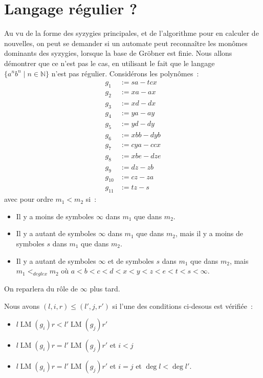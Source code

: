\documentclass{article}
\newcommand{\N}{\mathbb{N}}
\DeclareMathOperator{\LM}{LM}
\begin{document}
\section*{Langage régulier ?}
Au vu de la forme des syzygies principales, et de l'algorithme pour en calculer de nouvelles, on peut se demander si un automate peut reconnaître les monômes dominants des syzygies, lorsque la base de Gröbner est finie.
Nous allons démontrer que ce n'est pas le cas, en utilisant le fait que le langage $\{a^nb^n \;|\; n \in \N\}$ n'est pas régulier.
Considérons les polynômes~:
\begin{align*}
g_1 & := sa - tcx \\
g_2 & := xa - ax \\
g_3 & := xd - dx \\
g_4 & := ya - ay \\
g_5 & := yd - dy \\
g_6 & := xbb - dyb \\
g_7 & := cya - ccx \\
g_8 & := xbe - dze \\
g_9 & := dz - zb \\
g_{10} & := cz - za \\
g_{11} & := tz - s
\end{align*}
avec pour ordre $m_1 < m_2$ si~:
\begin{itemize}
\item Il y a moins de symboles $\infty$ dans $m_1$ que dans $m_2$.
\item Il y a autant de symboles $\infty$ dans $m_1$ que dans $m_2$, mais il y a moins de symboles $s$ dans $m_1$ que dans $m_2$.
\item Il y a autant de symboles $\infty$ et de symboles $s$ dans $m_1$ que dans $m_2$, mais
$m_1 <_{deglex} m_2$ où $a < b < c < d < x < y < z < e < t < s < \infty$.
\end{itemize}
On reparlera du rôle de $\infty$ plus tard.

Nous avons $(l, i, r) \leq (l', j, r')$ si l'une des conditions ci-desous est vérifiée~:
\begin{itemize}
	\item $l\LM(g_i)r < l'\LM(g_j)r'$
	\item $l\LM(g_i)r = l'\LM(g_j)r'$ et $i < j$
	\item $l\LM(g_i)r = l'\LM(g_j)r'$ et $i = j$ et $\deg{l} < \deg{l'}$.
\end{itemize}
\end{document}
